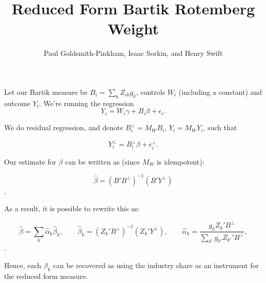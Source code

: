 

\title{Reduced Form Bartik Rotemberg Weight}
\author{Paul Goldsmith-Pinkham, Isaac Sorkin, and Henry Swift}

\maketitle

Let our Bartik measure be $B_{i} = \sum_{k}Z_{ik}g_{k}$, controls $W_{i}$ (including a constant) and outcome $Y_{i}$. We're running the regression
$$ Y_{i} = W_{i}\gamma + B_{i}\beta + \epsilon_{i}.$$

We do residual regression, and denote $B_{i}^{\perp} = M_{W}B_{i}$, $Y_{i} = M_{W}Y_{i}$, such that

$$Y_{i}^{\perp} = B_{i}^{\perp}\beta + \epsilon^{\perp}_{i}.$$

Our estimate for $\beta$ can be written as (since $M_{W}$ is idempotent):

$$\hat{\beta} = (B'B^{\perp})^{-1}(B'Y^{\perp})$$.

As a result, it is possible to rewrite this as:

$$\hat{\beta} = \sum_{k}\hat{\alpha}_{k}\hat{\beta}_{k}, \qquad \hat{\beta}_{k}  =(Z_{k}'B^{\perp})^{-1} (Z_{k}'Y^{\perp}), \qquad \hat{\alpha}_{k} = \frac{g_{k}Z_{k}'B^{\perp}}{\sum_{k'}g_{k'}Z_{k'}'B^{\perp}},$$.

Hence, each $\beta_{k}$ can be recovered as using the industry share as an instrument for the reduced form measure.

